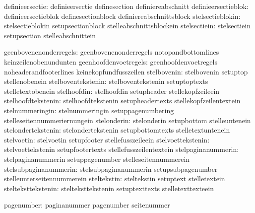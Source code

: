               definieersectie:  definieersectie              definesection
                                definiereabschnitt
          definieersectieblok:  definieersectieblok          definesectionblock
                                definiereabschnittsblock
             stelsectieblokin:  stelsectieblokin             setupsectionblock
                                stelleabschnittsblockein
                 stelsectiein:  stelsectiein                 setupsection
                                stelleabschnittein

       geenbovenenonderregels:  geenbovenenonderregels       notopandbottomlines
                                keinzeilenobenundunten
        geenhoofdenvoetregels:  geenhoofdenvoetregels        noheaderandfooterlines
                                keinekopfundfusszeilen
                  stelbovenin:  stelbovenin                  setuptop
                                stellenobenein
           stelboventekstenin:  stelboventekstenin           setuptoptexts
                                stelletextobenein
                  stelhoofdin:  stelhoofdin                  setupheader
                                stellekopfzeileein
           stelhoofdtekstenin:  stelhoofdtekstenin           setupheadertexts
                                stellekopfzeilentextein
              stelnummeringin:  stelnummeringin              setuppagenumbering
                                stelleseitennummeriernungein
                  stelonderin:  stelonderin                  setupbottom
                                stelleuntenein
           stelondertekstenin:  stelondertekstenin           setupbottomtexts
                                stelletextuntenein
                   stelvoetin:  stelvoetin                   setupfooter
                                stellefusszeileein
            stelvoettekstenin:  stelvoettekstenin            setupfootertexts
                                stellefusszeilentextein
           stelpaginanummerin:  stelpaginanummerin           setuppagenumber
                                stelleseitennummerein
        stelsubpaginanummerin:  stelsubpaginanummerin        setupsubpagenumber
                                stelleunterseitennummerein
                  steltekstin:  steltekstin                  setuptext
                                stelletextein
           stelteksttekstenin:  stelteksttekstenin           setuptexttexts
                                stelletexttexteein

                   pagenumber:  paginanummer                 pagenumber 
                                seitenummer

